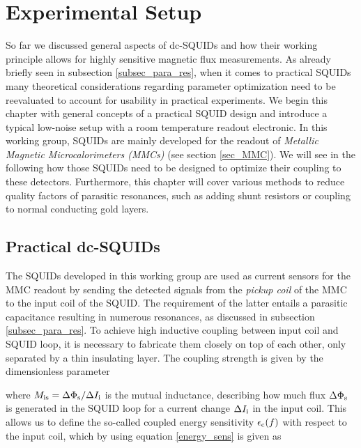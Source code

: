 \chapter{Experimental Setup}

So far we discussed general aspects of dc-SQUIDs and how their working principle allows for highly sensitive magnetic flux measurements. As already briefly seen in subsection \ref{subsec_para_res}, when it comes to practical SQUIDs many theoretical considerations regarding parameter optimization need to be reevaluated to account for usability in practical experiments. We begin this chapter with general concepts of a practical SQUID design and introduce a typical low-noise setup with a room temperature readout electronic. In this working group, SQUIDs are mainly developed for the readout of \textit{Metallic Magnetic Microcalorimeters (MMCs)} (see section \ref{sec_MMC}). We will see in the following how those SQUIDs need to be designed to optimize their coupling to these detectors. Furthermore, this chapter will cover various methods to reduce quality factors of parasitic resonances, such as adding shunt resistors or coupling to normal conducting gold layers.

\section{Practical dc-SQUIDs}\label{sec_practical_SQUID}

The SQUIDs developed in this working group are used as current sensors for the MMC readout by sending the detected signals from the \textit{pickup coil} of the MMC to the input coil of the SQUID. The requirement of the latter entails a parasitic capacitance resulting in numerous resonances, as discussed in subsection \ref{subsec_para_res}. To achieve high inductive coupling between input coil and SQUID loop, it is necessary to fabricate them closely on top of each other, only separated by a thin insulating layer. The coupling strength is given by the dimensionless parameter 


where $M_{\rm is}=\Delta\Phi_{\rm s}/\Delta I_{\rm i}$ is the mutual inductance, describing how much flux $\Delta\Phi_{\rm s}$ is generated in the SQUID loop for a current change $\Delta I_{\rm i}$ in the input coil. This allows us to define the so-called coupled energy sensitivity $\epsilon_{\rm c}(f)$ with respect to the input coil, which by using equation \ref{energy_sens} is given as

